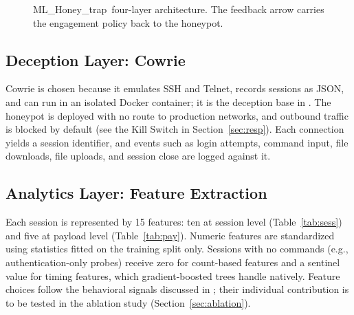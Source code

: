 \documentclass[conference]{IEEEtran}
\newcommand{\sys}{ML\_Honey\_trap}
\begin{document}
\begin{figure}[t]
\centering
{}
\caption{\sys\ four-layer architecture. The feedback arrow carries the engagement policy back to the honeypot.}
\label{fig:arch}
\end{figure}

\subsection{Deception Layer: Cowrie}
Cowrie is chosen because it emulates SSH and Telnet, records sessions as JSON, and can run in an isolated Docker container; it is the deception base in \cite{ref1,ref2,ref5}. The honeypot is deployed with no route to production networks, and outbound traffic is blocked by default (see the Kill Switch in Section~\ref{sec:resp}). Each connection yields a session identifier, and events such as login attempts, command input, file downloads, file uploads, and session close are logged against it.

\subsection{Analytics Layer: Feature Extraction}\label{sec:feat}
Each session is represented by 15 features: ten at session level (Table~\ref{tab:sess}) and five at payload level (Table~\ref{tab:pay}). Numeric features are standardized using statistics fitted on the training split only. Sessions with no commands (e.g., authentication-only probes) receive zero for count-based features and a sentinel value for timing features, which gradient-boosted trees handle natively. Feature choices follow the behavioral signals discussed in \cite{ref1,ref4}; their individual contribution is to be tested in the ablation study (Section~\ref{sec:ablation}).
\end{document}
